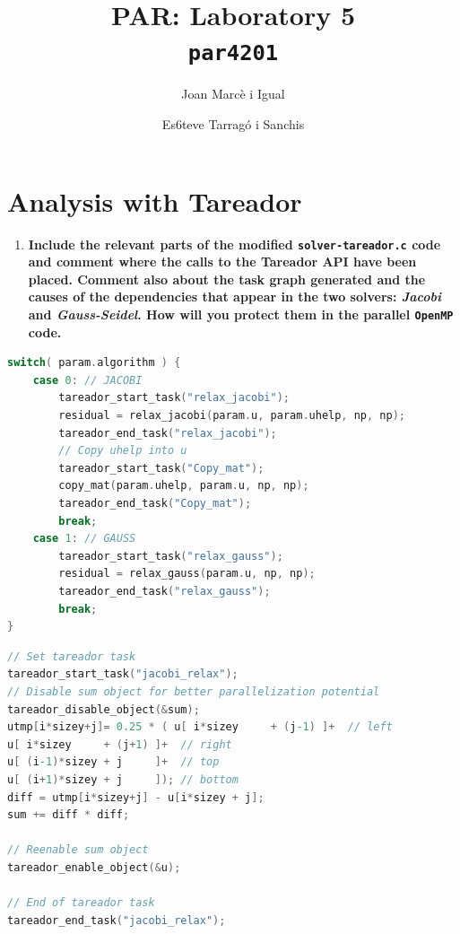 \documentclass[a4paper]{article}
\title{PAR: Laboratory 5 \\
		\texttt{\large par4201}}
\author{Joan Marcè i Igual \and Es6teve Tarragó i Sanchis}
\newenvironment{questionenum}{%
\setlist[enumerate]{resume}
\restartlist{enumerate}
\newcommand{\question}[1]{
\begin{enumerate}
	\item\bfseries ##1
\end{enumerate}
}}{%
}
\begin{document}
\maketitle
\tableofcontents

\section{Analysis with Tareador}

\begin{questionenum}
	\question{Include the relevant parts of the modified \texttt{solver-tareador.c} code and comment where the calls to the Tareador API have been placed. Comment also about the task graph generated and the causes of the dependencies that appear in the two solvers: \emph{Jacobi} and \emph{Gauss-Seidel}. How will you protect them in the parallel \texttt{OpenMP} code.}
\end{questionenum}

\begin{center}	
	\begin{minipage}{0.8\textwidth}
\begin{lstlisting}[language=C, title=\texttt{heat-tareador.c}]
switch( param.algorithm ) {
	case 0: // JACOBI
		tareador_start_task("relax_jacobi");
		residual = relax_jacobi(param.u, param.uhelp, np, np);
		tareador_end_task("relax_jacobi");
		// Copy uhelp into u
		tareador_start_task("Copy_mat");
		copy_mat(param.uhelp, param.u, np, np);
		tareador_end_task("Copy_mat");
		break;
	case 1: // GAUSS
		tareador_start_task("relax_gauss");
		residual = relax_gauss(param.u, np, np);
		tareador_end_task("relax_gauss");
		break;
}
		\end{lstlisting}
	\end{minipage}
	
	\begin{minipage}{0.8\textwidth}
		\begin{lstlisting}[language=C, title=\texttt{solver-tareador.c}]
// Set tareador task
tareador_start_task("jacobi_relax");
// Disable sum object for better parallelization potential
tareador_disable_object(&sum);
utmp[i*sizey+j]= 0.25 * ( u[ i*sizey     + (j-1) ]+  // left
u[ i*sizey     + (j+1) ]+  // right
u[ (i-1)*sizey + j     ]+  // top
u[ (i+1)*sizey + j     ]); // bottom
diff = utmp[i*sizey+j] - u[i*sizey + j];
sum += diff * diff;

// Reenable sum object
tareador_enable_object(&u);

// End of tareador task
tareador_end_task("jacobi_relax");
		\end{lstlisting}
	\end{minipage}
\end{center}
\end{document}
